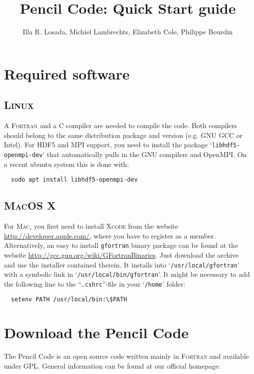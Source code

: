 \documentclass[a4paper,12pt]{article}
\title{Pencil Code: Quick Start guide}
\author{Illa R. Losada, Michiel Lambrechts, Elizabeth Cole, Philippe Bourdin}
\newcommand{\command}[1]{\texttt{#1}}
\newcommand{\file}[1]{``\texttt{#1}''}
\newcommand{\directory}[1]{`\texttt{#1}'}
\newcommand{\name}[1]{\textsc{#1}}
\begin{document}
\maketitle

\tableofcontents

\newpage


\section{Required software}

\subsection{\name{Linux}}
A \name{Fortran} and a \name{C} compiler are needed to compile the code.
Both compilers should belong to the same distribution package and version (e.g. GNU GCC or Intel).
For HDF5 and MPI support, you need to install the package \directory{libhdf5-openmpi-dev} that automatically pulls in the GNU compilers and OpenMPI. On a recent ubuntu system this is done with:
\begin{verbatim}
  sudo apt install libhdf5-openmpi-dev
\end{verbatim}

\subsection{\name{MacOS X}}
For \name{Mac}, you first need to install \name{Xcode} from the
website \url{http://developer.apple.com/}, where you have to register as a member.
Alternatively, an easy to install \command{gfortran} binary package can be found at the website \url{http://gcc.gnu.org/wiki/GFortranBinaries}. Just download the archive and use the installer contained therein.
It installs into \directory{/usr/local/gfortran} with
a symbolic link in \directory{/usr/local/bin/gfortran}. It might be necessary to add
the following line to the \file{.cshrc}-file in your \directory{/home} folder:
\begin{verbatim}
  setenv PATH /usr/local/bin:\$PATH
\end{verbatim}


\section{Download the Pencil Code}
The Pencil Code is an open source code written mainly in \name{Fortran} and available under GPL.
General information can be found at our official homepage:
\end{document}
